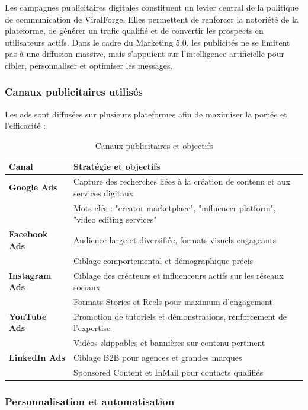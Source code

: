 Les campagnes publicitaires digitales constituent un levier central de la politique de communication de ViralForge. Elles permettent de renforcer la notoriété de la plateforme, de générer un trafic qualifié et de convertir les prospects en utilisateurs actifs. Dans le cadre du Marketing 5.0, les publicités ne se limitent pas à une diffusion massive, mais s'appuient sur l'intelligence artificielle pour cibler, personnaliser et optimiser les messages.

\subsubsection{Canaux publicitaires utilisés}

Les ads sont diffusées sur plusieurs plateformes afin de maximiser la portée et l'efficacité :

\begin{table}[H]
\centering
\caption{Canaux publicitaires et objectifs}
\label{tab:canaux-publicitaires}
\begin{tabular}{|l|p{10cm}|}
\hline
\textbf{Canal} & \textbf{Stratégie et objectifs} \\
\hline
\textbf{Google Ads} & Capture des recherches liées à la création de contenu et aux services digitaux \\
    & Mots-clés : "creator marketplace", "influencer platform", "video editing services" \\
\hline
\textbf{Facebook Ads} & Audience large et diversifiée, formats visuels engageants \\
    & Ciblage comportemental et démographique précis \\
\hline
\textbf{Instagram Ads} & Ciblage des créateurs et influenceurs actifs sur les réseaux sociaux \\
    & Formats Stories et Reels pour maximum d'engagement \\
\hline
\textbf{YouTube Ads} & Promotion de tutoriels et démonstrations, renforcement de l'expertise \\
    & Vidéos skippables et bannières sur contenu pertinent \\
\hline
\textbf{LinkedIn Ads} & Ciblage B2B pour agences et grandes marques \\
    & Sponsored Content et InMail pour contacts qualifiés \\
\hline
\end{tabular}
\end{table}

\subsubsection{Personnalisation et automatisation}

